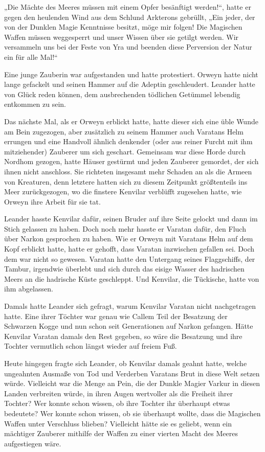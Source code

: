 „Die Mächte des Meeres müssen mit einem Opfer besänftigt werden!“, hatte er gegen den heulenden Wind aus dem Schlund Arkterons gebrüllt, „Ein jeder, der von der Dunklen Magie Kenntnisse besitzt, möge mir folgen! Die Magischen Waffen müssen weggesperrt und unser Wissen über sie getilgt werden. Wir versammeln uns bei der Feste von Yra und beenden diese Perversion der Natur ein für alle Mal!“

Eine junge Zauberin war aufgestanden und hatte protestiert. Orweyn hatte nicht lange gefackelt und seinen Hammer auf die Adeptin geschleudert. Leander hatte von Glück reden können, dem ausbrechenden tödlichen Getümmel lebendig entkommen zu sein.

Das nächste Mal, als er Orweyn erblickt hatte, hatte dieser sich eine üble Wunde am Bein zugezogen, aber zusätzlich zu seinem Hammer auch Varatans Helm errungen und eine Handvoll ähnlich denkender (oder aus reiner Furcht mit ihm mitziehender) Zauberer um sich geschart. Gemeinsam war diese Horde durch Nordhom gezogen, hatte Häuser gestürmt und jeden Zauberer gemordet, der sich ihnen nicht anschloss. Sie richteten insgesamt mehr Schaden an als die Armeen von Kreaturen, denn letztere hatten sich zu diesem Zeitpunkt größtenteils ins Meer zurückgezogen, wo die finstere Kenvilar verblüfft zugesehen hatte, wie Orweyn ihre Arbeit für sie tat.

Leander hasste Kenvilar dafür, seinen Bruder auf ihre Seite gelockt und dann im Stich gelassen zu haben. Doch noch mehr hasste er Varatan dafür, den Fluch über Narkon gesprochen zu haben. Wie er Orweyn mit Varatans Helm auf dem Kopf erblickt hatte, hatte er gehofft, dass Varatan inzwischen gefallen sei. Doch dem war nicht so gewesen. Varatan hatte den Untergang seines Flaggschiffs, der Tambur, irgendwie überlebt und sich durch das eisige Wasser des hadrischen Meers an die hadrische Küste geschleppt. Und Kenvilar, die Tückische, hatte von ihm abgelassen.

Damals hatte Leander sich gefragt, warum Kenvilar Varatan nicht nachgetragen hatte. Eine ihrer Töchter war genau wie Callem Teil der Besatzung der Schwarzen Kogge und nun schon seit Generationen auf Narkon gefangen. Hätte Kenvilar Varatan damals den Rest gegeben, so wäre die Besatzung und ihre Tochter vermutlich schon längst wieder auf freiem Fuß.

Heute hingegen fragte sich Leander, ob Kenvilar damals geahnt hatte, welche ungeahnten Ausmaße von Tod und Verderben Varatans Brut in diese Welt setzen würde. Vielleicht war die Menge an Pein, die der Dunkle Magier Varkur in diesen Landen verbreiten würde, in ihren Augen wertvoller als die Freiheit ihrer Tochter? Wer konnte schon wissen, ob ihre Tochter ihr überhaupt etwas bedeutete? Wer konnte schon wissen, ob sie überhaupt wollte, dass die Magischen Waffen unter Verschluss blieben? Vielleicht hätte sie es geliebt, wenn ein mächtiger Zauberer mithilfe der Waffen zu einer vierten Macht des Meeres aufgestiegen wäre.

